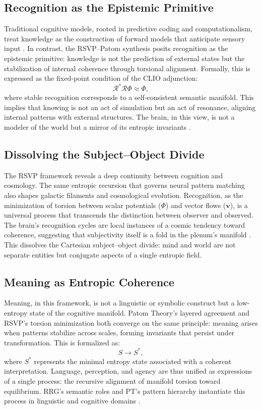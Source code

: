 \documentclass[11pt]{article}
\begin{document}
\subsection{Recognition as the Epistemic Primitive}
Traditional cognitive models, rooted in predictive coding and computationalism, treat knowledge as the construction of forward models that anticipate sensory input \citep{clark2013whatever, friston2010free}. In contrast, the RSVP--Patom synthesis posits recognition as the epistemic primitive: knowledge is not the prediction of external states but the stabilization of internal coherence through torsional alignment. Formally, this is expressed as the fixed-point condition of the CLIO adjunction:
\[
\mathcal{R}^{\ast}\mathcal{R}\Phi \approx \Phi,
\]
where stable recognition corresponds to a self-consistent semantic manifold. This implies that knowing is not an act of simulation but an act of resonance, aligning internal patterns with external structures. The brain, in this view, is not a modeler of the world but a mirror of its entropic invariants \citep{leibniz1714monadology, piaget1980thinking}.

\subsection{Dissolving the Subject--Object Divide}
The RSVP framework reveals a deep continuity between cognition and cosmology. The same entropic recursion that governs neural pattern matching also shapes galactic filaments and cosmological evolution. Recognition, as the minimization of torsion between scalar potentials ($\Phi$) and vector flows ($\mathbf{v}$), is a universal process that transcends the distinction between observer and observed. The brain’s recognition cycles are local instances of a cosmic tendency toward coherence, suggesting that subjectivity itself is a fold in the plenum’s manifold \citep{saussure1916course, everaert2011semiotics}. This dissolves the Cartesian subject--object divide: mind and world are not separate entities but conjugate aspects of a single entropic field.

\subsection{Meaning as Entropic Coherence}
Meaning, in this framework, is not a linguistic or symbolic construct but a low-entropy state of the cognitive manifold. Patom Theory’s layered agreement and RSVP’s torsion minimization both converge on the same principle: meaning arises when patterns stabilize across scales, forming invariants that persist under transformation. This is formalized as:
\[
S \to S^\ast,
\]
where $S^\ast$ represents the minimal entropy state associated with a coherent interpretation. Language, perception, and agency are thus unified as expressions of a single process: the recursive alignment of manifold torsion toward equilibrium. RRG’s semantic roles and PT’s pattern hierarchy instantiate this process in linguistic and cognitive domains \citep{vanvalin2001role, jackendoff2012semantics, lobner2013semantics}.
\end{document}
